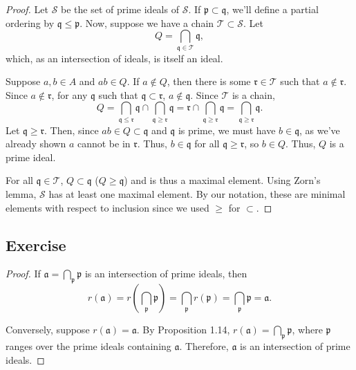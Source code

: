 \begin{proof}
Let $\mathcal{S}$ be the set of prime ideals of $\mathcal{S}$. If $\mathfrak{p} \subset \mathfrak{q}$, we'll define a partial ordering
by $\mathfrak{q} \le \mathfrak{p}$. Now, suppose we have a chain $\mathcal{T} \subset \mathcal{S}$. Let 
$$Q = \bigcap_{\mathfrak{q} \in \mathcal{T}}\mathfrak{q},$$
which, as an intersection of ideals, is itself an ideal.

Suppose $a,b \in A$ and $ab \in Q$. If $a \not\in Q$, then there is some $\mathfrak{r} \in \mathcal{T}$ such that 
$a \not\in \mathfrak{r}$. Since $a \not\in \mathfrak{r}$, for any $\mathfrak{q}$ such that $\mathfrak{q} \subset \mathfrak{r}$, $a\not\in\mathfrak{q}$.
Since $\mathcal{T}$ is a chain,
$$Q = \bigcap_{\mathfrak{q} \le \mathfrak{r}}\mathfrak{q} \cap \bigcap_{\mathfrak{q} \ge \mathfrak{r}}\mathfrak{q}
= \mathfrak{r}\cap \bigcap_{\mathfrak{q} \ge \mathfrak{r}}\mathfrak{q}
= \bigcap_{\mathfrak{q} \ge \mathfrak{r}}\mathfrak{q}.$$
Let $\mathfrak{q} \ge \mathfrak{r}$. Then, since $ab \in Q \subset \mathfrak{q}$ and $\mathfrak{q}$ is prime, we must have $b \in \mathfrak{q}$, as we've
already shown $a$ cannot be in $\mathfrak{r}$. Thus, $b \in \mathfrak{q}$ for all $\mathfrak{q} \ge \mathfrak{r}$, so $b \in Q$. Thus, $Q$ is a prime ideal.

For all $\mathfrak{q} \in \mathcal{T}$, $Q \subset \mathfrak{q}$ ($Q \ge \mathfrak{q}$) and is thus a maximal element. Using Zorn's lemma, $\mathcal{S}$
has at least one maximal element. By our notation, these are minimal elements with respect to inclusion since we used $\ge$ for $\subset$.
\end{proof}

\subsection{Exercise}\label{1.9}

\begin{proof}
If $\mathfrak{a} = \bigcap_{\mathfrak{p}} \mathfrak{p}$ is an intersection of prime ideals, then
$$r(\mathfrak{a}) = r\left(\bigcap_{\mathfrak{p}}\mathfrak{p}\right) = \bigcap_{\mathfrak{p}}r\left(\mathfrak{p}\right) = \bigcap_{\mathfrak{p}}\mathfrak{p} = \mathfrak{a}.$$

Conversely, suppose $r(\mathfrak{a}) = \mathfrak{a}$. By Proposition 1.14, $r(\mathfrak{a}) = \bigcap_{\mathfrak{p}} \mathfrak{p}$, where $\mathfrak{p}$ ranges over the prime ideals
containing $\mathfrak{a}$. Therefore, $\mathfrak{a}$ is an intersection of prime ideals.
\end{proof}

